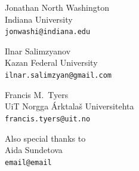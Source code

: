 \documentclass[a0paper,fontscale=0.3]{baposter}  %
\begin{document}
\begin{poster}
{			\vspace{-0.5em}
			\begin{center}
			{\begin{minipage}[t]{11.75em}
				\begin{spacing}{0.4}
					{Jonathan North Washington}\\
					{\footnotesize Indiana University\\\texttt{jonwashi@indiana.edu}}
				\end{spacing}
			\end{minipage}
			\begin{minipage}[t]{9.5em}
				\begin{spacing}{0.4}
					{Ilnar Salimzyanov}\\
					{\footnotesize Kazan Federal University\\\texttt{ilnar.salimzyan@gmail.com}}
				\end{spacing}
			\end{minipage}
			\begin{minipage}[t]{8.2em}
				\begin{spacing}{0.4}
					{Francis M.\ Tyers}\\
					{\footnotesize UiT Norgga Árktalaš Universitehta \\\texttt{francis.tyers@uit.no}}
				\end{spacing}
			\end{minipage}}
			\begin{minipage}[t]{7em}
				\begin{spacing}{0.4}
					{\footnotesize Also special thanks to}\\
					{\small Aida Sundetova}\\
					{\footnotesize \texttt{email@email}}
				\end{spacing}
			\end{minipage}
			\end{center}


}
\end{poster}
\end{document}
